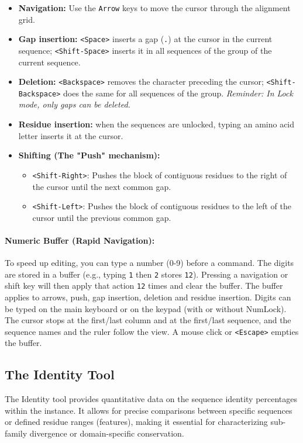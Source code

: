 \documentclass[a4paper]{article}
\begin{document}
\begin{itemize}
    \item \textbf{Navigation:} Use the \texttt{Arrow} keys to move the cursor through the alignment grid.
    \item \textbf{Gap insertion:} \texttt{<Space>} inserts a gap (\texttt{.}) at the cursor in the current sequence; \texttt{<Shift-Space>} inserts it in all sequences of the group of the current sequence.
    \item \textbf{Deletion:} \texttt{<Backspace>} removes the character preceding the cursor; \texttt{<Shift-Backspace>} does the same for all sequences of the group. \textit{Reminder: In Lock mode, only gaps can be deleted.}
    \item \textbf{Residue insertion:} when the sequences are unlocked, typing an amino acid letter inserts it at the cursor.
    \item \textbf{Shifting (The "Push" mechanism):} 
    \begin{itemize}
        \item \texttt{<Shift-Right>}: Pushes the block of contiguous residues to the right of the cursor until the next common gap.
        \item \texttt{<Shift-Left>}: Pushes the block of contiguous residues to the left of the cursor until the previous common gap.
    \end{itemize}
\end{itemize}



\paragraph{Numeric Buffer (Rapid Navigation):} 
To speed up editing, you can type a number (0-9) before a command. The digits are stored in a buffer (e.g., typing \texttt{1} then \texttt{2} stores \texttt{12}). Pressing a navigation or shift key will then apply that action \texttt{12} times and clear the buffer. The buffer applies to arrows, push, gap insertion, deletion and residue insertion. Digits can be typed on the main keyboard or on the keypad (with or without NumLock). The cursor stops at the first/last column and at the first/last sequence, and the sequence names and the ruler follow the view. A mouse click or \texttt{<Escape>} empties the buffer.

\subsection{The Identity Tool}
\label{tool-identity}
The Identity tool provides quantitative data on the sequence identity percentages within the instance. It allows for precise comparisons between specific sequences or defined residue ranges (features), making it essential for characterizing sub-family divergence or domain-specific conservation.
\end{document}
